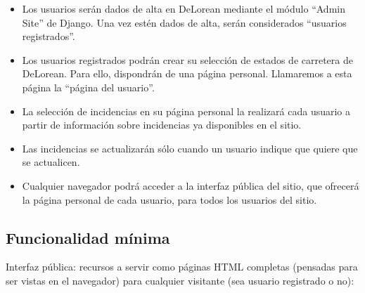 \begin{itemize}
\item Los usuarios serán dados de alta en DeLorean mediante el módulo ``Admin Site'' de Django. Una vez estén dados de alta, serán considerados ``usuarios registrados''.

\item Los usuarios registrados podrán crear su selección de estados de carretera de DeLorean. Para ello, dispondrán de una página personal. Llamaremos a esta página la ``página del usuario''.

\item La selección de incidencias en su página personal la realizará cada usuario a partir de información sobre incidencias ya disponibles en el sitio.

\item Las incidencias se actualizarán sólo cuando un usuario indique que quiere que se actualicen.

\item Cualquier navegador podrá acceder a la interfaz pública del sitio, que ofrecerá la página personal de cada usuario, para todos los usuarios del sitio.
\end{itemize}


\subsection{Funcionalidad mínima}

Interfaz pública: recursos a servir como páginas HTML completas (pensadas para ser vistas en el navegador) para cualquier visitante (sea usuario registrado o no):

